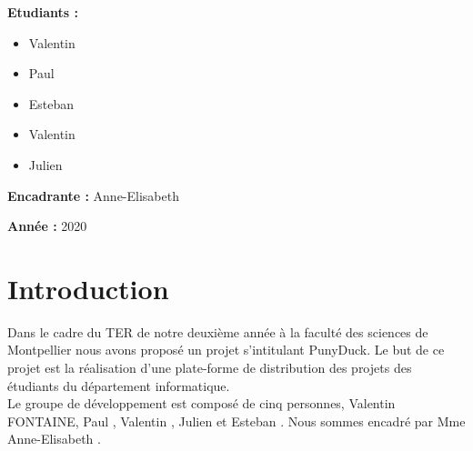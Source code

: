 \documentclass{report}
\begin{document}
\begin{titlepage}
\begin{minipage}[t]{8.5cm}
	\begin{flushleft}
	    \large{\textbf{Etudiants :}}
	    \begin{itemize}[label=]
	        \item \large{Valentin }
	        \item \large{Paul  } 
	        \item \large{Esteban }
	        \item \large{Valentin }
	        \item \large{Julien }
	    \end{itemize}
		\vspace{0.5cm}
		\large{\textbf{Encadrante :}}
		\large{Anne-Elisabeth } \\
	\end{flushleft}
\end{minipage}
\hfill
\begin{minipage}[t]{8cm}
	\begin{flushright} 
		\large{\textbf{Année :} 2020} 
	\end{flushright}
\end{minipage}
\end{titlepage}

\begin{titlepage}
\renewcommand{\contentsname}{Sommaire}
\setcounter{tocdepth}{1}
\large{\tableofcontents}
\thispagestyle{empty}
\end{titlepage}

\renewcommand{\chaptername}{Partie}



\chapter*{Introduction} %
Dans le cadre du TER de notre deuxième année à la faculté des sciences de Montpellier nous avons proposé un projet s'intitulant PunyDuck. Le but de ce projet est la réalisation d'une plate-forme de distribution des projets des étudiants du département informatique.\\

Le groupe de développement est composé de cinq personnes, Valentin \textsc{FONTAINE}, Paul , Valentin , Julien  et Esteban . Nous sommes encadré par Mme Anne-Elisabeth .
\end{document}
